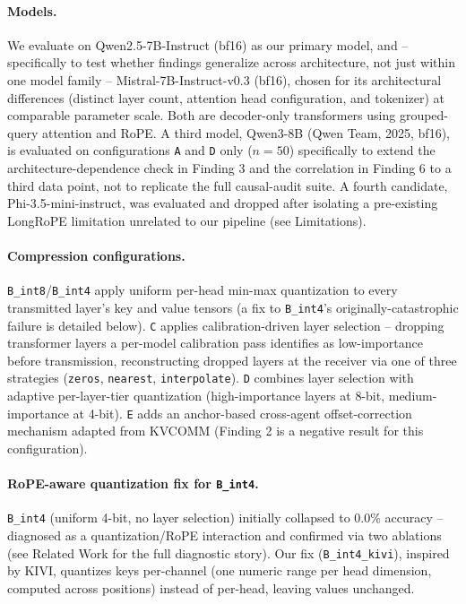 \documentclass[11pt]{article}
\begin{document}
\paragraph{Models.} We evaluate on Qwen2.5-7B-Instruct
\citep{qwen2p5_2024} (bf16) as our primary model, and -- specifically to
test whether findings generalize across architecture, not just within one
model family -- Mistral-7B-Instruct-v0.3 \citep{mistral7b2023} (bf16),
chosen for its architectural differences (distinct layer count, attention
head configuration, and tokenizer) at comparable parameter scale. Both are
decoder-only transformers using grouped-query attention and RoPE. A third
model, Qwen3-8B (Qwen Team, 2025, bf16), is evaluated on configurations
\texttt{A} and \texttt{D} only ($n=50$) specifically to extend the
architecture-dependence check in Finding 3 and the correlation in
Finding 6 to a third data point, not to replicate the full causal-audit
suite. A fourth candidate, Phi-3.5-mini-instruct, was evaluated and
dropped after isolating a pre-existing LongRoPE limitation unrelated to
our pipeline (see Limitations).

\paragraph{Compression configurations.} \texttt{B\_int8}/\texttt{B\_int4}
apply uniform per-head min-max quantization to every transmitted layer's
key and value tensors (a fix to \texttt{B\_int4}'s originally-catastrophic
failure is detailed below). \texttt{C} applies calibration-driven layer
selection -- dropping transformer layers a per-model calibration pass
identifies as low-importance before transmission, reconstructing dropped
layers at the receiver via one of three strategies (\texttt{zeros},
\texttt{nearest}, \texttt{interpolate}). \texttt{D} combines layer
selection with adaptive per-layer-tier quantization (high-importance
layers at 8-bit, medium-importance at 4-bit). \texttt{E} adds an
anchor-based cross-agent offset-correction mechanism adapted from KVCOMM
(Finding 2 is a negative result for this configuration).

\paragraph{RoPE-aware quantization fix for \texttt{B\_int4}.}
\texttt{B\_int4} (uniform 4-bit, no layer selection) initially collapsed
to 0.0\% accuracy -- diagnosed as a quantization/RoPE interaction and
confirmed via two ablations (see Related Work for the full diagnostic
story). Our fix (\texttt{B\_int4\_kivi}), inspired by KIVI, quantizes keys
per-channel (one numeric range per head dimension, computed across
positions) instead of per-head, leaving values unchanged.
\end{document}
